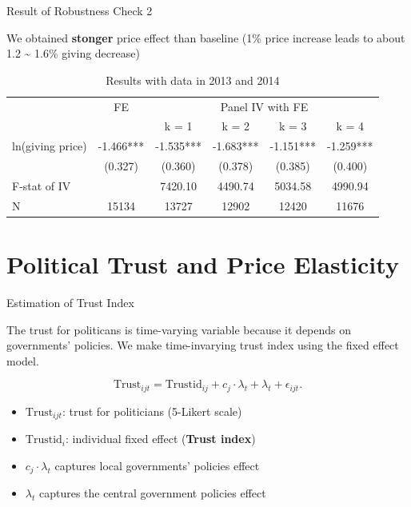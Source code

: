 \documentclass[
  ignorenonframetext,
]{beamer}
\providecommand{\tightlist}{%
  \setlength{\itemsep}{0pt}\setlength{\parskip}{0pt}}
\begin{document}
\begin{frame}{Result of Robustness Check 2}
\protect\hypertarget{result-of-robustness-check-2}{}

We obtained \textbf{stonger} price effect than baseline (1\% price
increase leads to about 1.2 \textasciitilde{} 1.6\% giving decrease)

\begin{table}

\caption{\label{tab:kableRobust2EstimateElasticity}Results with data in 2013 and 2014}
\centering
\fontsize{9}{11}\selectfont
\begin{tabular}[t]{lccccc}
\toprule
\multicolumn{1}{c}{ } & \multicolumn{1}{c}{FE} & \multicolumn{4}{c}{Panel IV with FE} \\
\cmidrule(l{3pt}r{3pt}){2-2} \cmidrule(l{3pt}r{3pt}){3-6}
 &  & k = 1 & k = 2 & k = 3 & k = 4\\
\midrule
ln(giving price) & -1.466*** & -1.535*** & -1.683*** & -1.151*** & -1.259***\\
 & (0.327) & (0.360) & (0.378) & (0.385) & (0.400)\\
F-stat of IV &  & 7420.10 & 4490.74 & 5034.58 & 4990.94\\
N & 15134 & 13727 & 12902 & 12420 & 11676\\
\bottomrule
\end{tabular}
\end{table}

\end{frame}

\hypertarget{political-trust-and-price-elasticity}{%
\section{Political Trust and Price
Elasticity}\label{political-trust-and-price-elasticity}}

\begin{frame}{Estimation of Trust Index}
\protect\hypertarget{estimation-of-trust-index}{}

The trust for politicans is time-varying variable because it depends on
governments' policies. We make time-invarying trust index using the
fixed effect model.

\[
    \text{Trust}_{ijt} = \text{Trustid}_{ij} + c_j \cdot \lambda_t + \lambda_t + \epsilon_{ijt}.
\]

\begin{itemize}
\tightlist
\item
  \(\text{Trust}_{ijt}\): trust for politicians (5-Likert scale)
\item
  \(\text{Trustid}_i\): individual fixed effect (\textbf{Trust index})
\item
  \(c_j \cdot \lambda_t\) captures local governments' policies effect
\item
  \(\lambda_t\) captures the central government policies effect
\end{itemize}

\end{frame}
\end{document}
